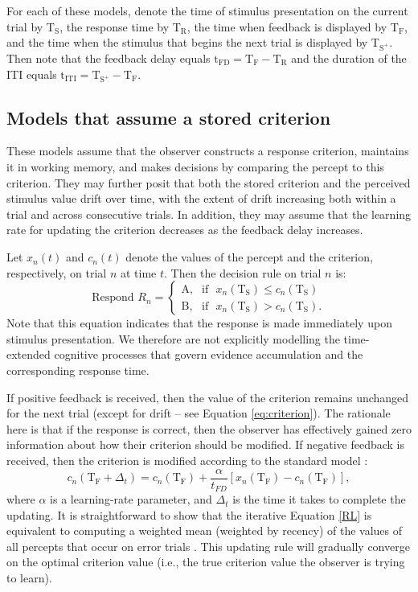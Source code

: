\documentclass[doc, floatsintext]{apa7}
\begin{document}
For each of these models, denote the time of stimulus
presentation on the current trial by T$_\text{S}$, the
response time by T$_\text{R}$, the time when feedback is
displayed by T$_\text{F}$, and the time when the stimulus
that begins the next trial is displayed by T$_{\text{S}^+}$.
Then note that the feedback delay equals $\text{t}_\text{FD}
= \text{T}_\text{F} - \text{T}_\text{R}$ and the duration of
the ITI equals $\text{t}_\text{ITI} = \text{T}_{\text{S}^+}
- \text{T}_\text{F}$.

\subsection{Models that assume a stored criterion}
These models assume that the observer constructs a response
criterion, maintains it in working memory, and makes
decisions by comparing the percept to this criterion. They
may further posit that both the stored criterion and the
perceived stimulus value drift over time, with the extent of
drift increasing both within a trial and across consecutive
trials. In addition, they may assume that the learning rate
for updating the criterion decreases as the feedback delay
increases.

Let $x_n(t)$ and $c_n(t)$ denote the values of the percept
and the criterion, respectively, on trial $n$ at time $t$.
Then the decision rule on trial $n$ is:
\begin{equation}
  \text{Respond } R_n =
  \begin{cases}
    \text{A}, & \text{if ~} x_n(\text{T}_\text{S}) \leq c_n(\text{T}_\text{S})  \\
    \text{B}, & \text{if ~} x_n(\text{T}_\text{S}) > c_n(\text{T}_\text{S}).
  \end{cases}
  \label{eq:DR}
\end{equation}
Note that this equation indicates that the response is made
immediately upon stimulus presentation. We therefore are not
explicitly modelling the time-extended cognitive processes
that govern evidence accumulation and the corresponding
response time.

If positive feedback is received, then the value of the
criterion remains unchanged for the next trial (except for
drift -- see Equation \ref{eq:criterion}).  The rationale
here is that if the response is correct, then the observer
has effectively gained zero information about how their
criterion should be modified.  If negative feedback is
received, then the criterion is modified according to the
standard model
\parencite{SuttonBarto1998}:
\begin{equation}
c_n(\text{T}_\text{F}+ \Delta_t) = c_n(\text{T}_\text{F}) + \frac{\alpha}{t_{FD}} [x_n(\text{T}_\text{F}) - c_n(\text{T}_\text{F})],
\label{RL}
\end{equation}
where $\alpha$ is a learning-rate parameter, and $\Delta_t$
is the time it takes to complete the updating.  It is
straightforward to show that the iterative Equation \ref{RL}
is equivalent to computing a weighted mean (weighted by
recency) of the values of all percepts that occur on error
trials \parencite[e.g.,][]{Ashby2017}. This updating rule
will gradually converge on the optimal criterion value
(i.e., the true criterion value the observer is trying to
learn).  
\end{document}
